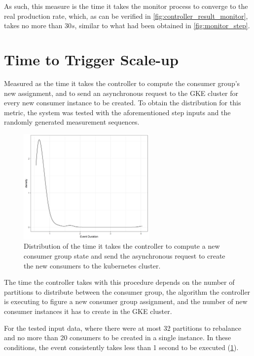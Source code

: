 As such, this measure is the time it takes the monitor process to converge to the real production rate, which, as can be verified in \ref{fig:controller_result_monitor}, takes no more than $30s$, similar to what had been obtained in \ref{fig:monitor_step}.

\section{Time to Trigger Scale-up}

Measured as the time it takes the controller to compute the consumer group's new assignment, and to send an asynchronous request to the GKE cluster for every new consumer instance to be created. To obtain the distribution for this metric, the system was tested with the aforementioned step inputs and the randomly generated measurement sequences.

\begin{figure}[htb!]
    \centering
    \includegraphics[width=0.6\textwidth]{images/integration/delta2.png}
\caption{Distribution of the time it takes the controller to compute a new consumer group state and send the asynchronous request to create the new consumers to the kubernetes cluster.}
\label{fig:controller_result_trigger}
\end{figure}

The time the controller takes with this procedure depends on the number of partitions to distribute between the consumer group, the algorithm the controller is executing to figure a new consumer group assignment, and the number of new consumer instances it has to create in the GKE cluster.

For the tested input data, where there were at most 32 partitions to rebalance and no more than 20 consumers to be created in a single instance. In these conditions, the event consistently takes less than 1 second to be executed (\ref{fig:controller_result_trigger}).

